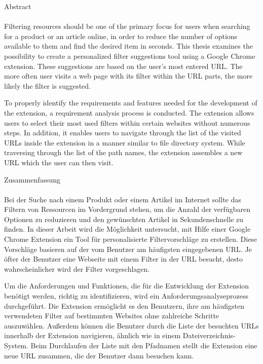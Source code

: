 \newpage
\thispagestyle{empty}
\vspace*{2.2cm}
\noindent %
{\Huge Abstract}\\
\vspace*{1.6cm} \\

\pagestyle{headings}
Filtering resources should be one of the primary focus for users when searching for a product or an article online, in order to reduce the number of options available to them and find the desired item in seconds. This thesis examines the possibility to create a personalized filter suggestions tool using a Google Chrome extension. These suggestions are based on the user's most entered URL. The more often user visits a web page with its filter within the URL parts, the more likely the filter is suggested.

To properly identify the requirements and features needed for the development of the extension, a requirement analysis process is conducted. The extension allows users to select their most used filters within certain websites without numerous steps. In addition, it enables users to navigate through the list of the visited URLs inside the extension in a manner similar to file directory system. While traversing through the list of the path names, the extension assembles a new URL which the user can then visit.

\newpage
\thispagestyle{empty}
\vspace*{2.2cm}
\noindent %
{\Huge Zusammenfassung}\\
\vspace*{1.6cm} \\

\pagestyle{headings}
Bei der Suche nach einem Produkt oder einem Artikel im Internet sollte das Filtern von Ressourcen im Vordergrund stehen, um die Anzahl der verf\"ugbaren Optionen zu reduzieren und den gew\"unschten Artikel in Sekundenschnelle zu finden. In dieser Arbeit wird die M\"oglichkeit untersucht, mit Hilfe einer Google Chrome Extension ein Tool f\"ur personalisierte Filtervorschl\"age zu erstellen. Diese Vorschl\"age basieren auf der vom Benutzer am h\"aufigsten eingegebenen URL. Je \"ofter der Benutzer eine Webseite mit einem Filter in der URL besucht, desto wahrscheinlicher wird der Filter vorgeschlagen.

Um die Anforderungen und Funktionen, die f\"ur die Entwicklung der Extension ben\"otigt werden, richtig zu identifizieren, wird ein Anforderungsanalyseprozess durchgef\"uhrt. Die Extension erm\"oglicht es den Benutzern, ihre am h\"aufigsten verwendeten Filter auf bestimmten Websites ohne zahlreiche Schritte auszuw\"ahlen. Au{\ss}erdem k\"onnen die Benutzer durch die Liste der besuchten URLs innerhalb der Extension navigieren, \"ahnlich wie in einem Dateiverzeichnis-System. Beim Durchlaufen der Liste mit den Pfadnamen stellt die Extension eine neue URL zusammen, die der Benutzer dann besuchen kann.
